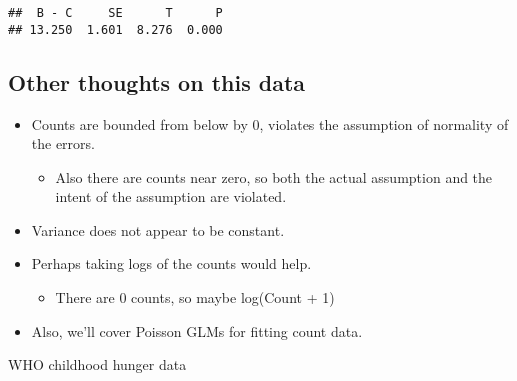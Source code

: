 \documentclass[12pt,openright,oneside,a4paper,chapter=TITLE,section=TITLE,subsection=Title,english,french,spanish,portugues,sumario=tradicional]{04-class-files/abntex2}
\newenvironment{Shaded}{\begin{snugshade}}{\end{snugshade}}
\newcommand{\CommentTok}[1]{\textcolor[rgb]{0.56,0.35,0.01}{\textit{#1}}}
\newcommand{\DecValTok}[1]{\textcolor[rgb]{0.00,0.00,0.81}{#1}}
\newcommand{\KeywordTok}[1]{\textcolor[rgb]{0.13,0.29,0.53}{\textbf{#1}}}
\newcommand{\NormalTok}[1]{#1}
\newcommand{\OperatorTok}[1]{\textcolor[rgb]{0.81,0.36,0.00}{\textbf{#1}}}
\newcommand{\StringTok}[1]{\textcolor[rgb]{0.31,0.60,0.02}{#1}}
\providecommand{\tightlist}{%
  \setlength{\itemsep}{0pt}\setlength{\parskip}{0pt}}
\begin{document}
\begin{verbatim}
##  B - C     SE      T      P 
## 13.250  1.601  8.276  0.000
\end{verbatim}

\hypertarget{other-thoughts-on-this-data}{%
\subsection{Other thoughts on this data}\label{other-thoughts-on-this-data}}

\begin{itemize}
\tightlist
\item
  Counts are bounded from below by 0, violates the assumption of normality of the errors.

  \begin{itemize}
  \tightlist
  \item
    Also there are counts near zero, so both the actual assumption and the intent of the assumption are violated.
  \end{itemize}
\item
  Variance does not appear to be constant.
\item
  Perhaps taking logs of the counts would help.

  \begin{itemize}
  \tightlist
  \item
    There are 0 counts, so maybe log(Count + 1)
  \end{itemize}
\item
  Also, we'll cover Poisson GLMs for fitting count data.
\end{itemize}

WHO childhood hunger data

\begin{Shaded}
\end{Shaded}
\end{document}

